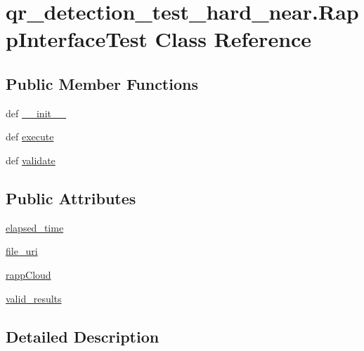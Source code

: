 \hypertarget{classqr__detection__test__hard__near_1_1RappInterfaceTest}{\section{qr\-\_\-detection\-\_\-test\-\_\-hard\-\_\-near.\-Rapp\-Interface\-Test Class Reference}
\label{classqr__detection__test__hard__near_1_1RappInterfaceTest}
}
\subsection*{Public Member Functions}
\begin{DoxyCompactItemize}
\item 
def \hyperlink{classqr__detection__test__hard__near_1_1RappInterfaceTest_aa504e13781ae3f1e33fec9e1615e6e1a}{\-\_\-\-\_\-init\-\_\-\-\_\-}
\item 
def \hyperlink{classqr__detection__test__hard__near_1_1RappInterfaceTest_aff7a9de9bf4a490e8bb0a5b1bd9a83dc}{execute}
\item 
def \hyperlink{classqr__detection__test__hard__near_1_1RappInterfaceTest_a151eaf44f02388eec9467984a142a8d2}{validate}
\end{DoxyCompactItemize}
\subsection*{Public Attributes}
\begin{DoxyCompactItemize}
\item 
\hyperlink{classqr__detection__test__hard__near_1_1RappInterfaceTest_a87150a6c7025abd61a37ae75aadb8c74}{elapsed\-\_\-time}
\item 
\hyperlink{classqr__detection__test__hard__near_1_1RappInterfaceTest_a1b5d3b35522ba94ef5706bf98fde2fc7}{file\-\_\-uri}
\item 
\hyperlink{classqr__detection__test__hard__near_1_1RappInterfaceTest_aac1ed8b4c41ac8a5a079c67d7801e9c0}{rapp\-Cloud}
\item 
\hyperlink{classqr__detection__test__hard__near_1_1RappInterfaceTest_a93e2f80f921131bb4efcbdd7004fc57c}{valid\-\_\-results}
\end{DoxyCompactItemize}


\subsection{Detailed Description}


